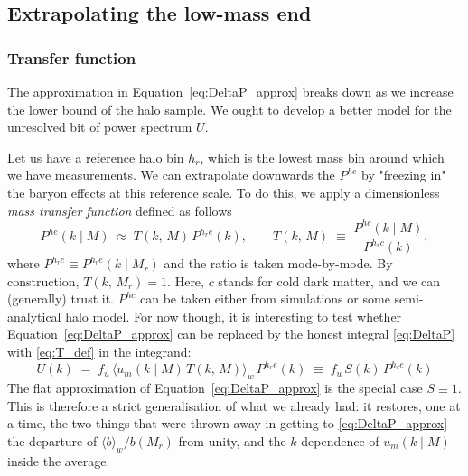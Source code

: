 \documentclass{article}
\begin{document}
\subsection{Extrapolating the low-mass end}

\subsubsection{Transfer function}

The approximation in Equation~\ref{eq:DeltaP_approx} breaks down as we increase the lower bound of the halo sample. We ought to develop a better model for the unresolved bit of power spectrum $U$.

Let us have a reference halo bin $h_r$, which is the lowest mass bin around which we have measurements. We can extrapolate downwards the $P^{he}$ by "freezing in" the baryon effects at this reference scale. To do this, we apply a dimensionless \emph{mass transfer function} defined as follows
\begin{equation} \label{eq:T_def}
    P^{he} (k \mid M) \; \approx \; T(k,\, M) \, P^{h_re}(k), \qquad T(k, \, M) \;\equiv\; \frac{P^{hc}(k \mid M)}{P^{h_rc}(k)},
\end{equation}
where $P^{h_re} \equiv P^{h_re}(k \mid M_r)$ and the ratio is taken mode-by-mode. By construction, $T(k, \, M_r) = 1$. Here, $c$ stands for cold dark matter, and we can (generally) trust it. $P^{hc}$ can be taken either from simulations or some semi-analytical halo model. For now though, it is interesting to test whether Equation~\eqref{eq:DeltaP_approx} can be replaced by the honest integral \eqref{eq:DeltaP} with \eqref{eq:T_def} in the integrand:
\begin{equation} \label{eq:expA_master}
    U(k) \;=\; f_u \, \big\langle u_m(k \mid M) \, T(k, \,M) \big\rangle_w \, P^{h_re}(k)
    \;\equiv\; f_u \, S(k) \, P^{h_re}(k)
\end{equation}
The flat approximation of Equation~\eqref{eq:DeltaP_approx} is the special case $S \equiv 1$. This is therefore a strict generalisation of what we already had: it restores, one at a time, the two things that were thrown away in getting to \eqref{eq:DeltaP_approx}---the departure of $\langle b \rangle_w / b(M_r)$ from unity, and the $k$ dependence of $u_m(k \mid M)$ inside the average.
\end{document}
